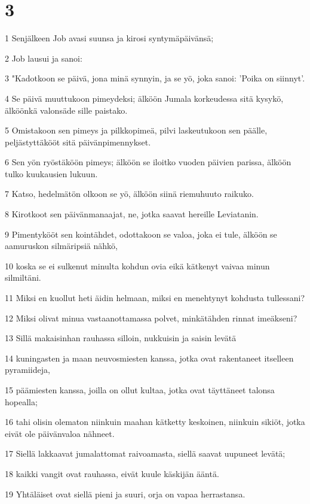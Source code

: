 \chapter{3}

\par 1 Senjälkeen Job avasi suunsa ja kirosi syntymäpäivänsä;
\par 2 Job lausui ja sanoi:
\par 3 "Kadotkoon se päivä, jona minä synnyin, ja se yö, joka sanoi: 'Poika on siinnyt'.
\par 4 Se päivä muuttukoon pimeydeksi; älköön Jumala korkeudessa sitä kysykö, älköönkä valonsäde sille paistako.
\par 5 Omistakoon sen pimeys ja pilkkopimeä, pilvi laskeutukoon sen päälle, peljästyttäkööt sitä päivänpimennykset.
\par 6 Sen yön ryöstäköön pimeys; älköön se iloitko vuoden päivien parissa, älköön tulko kuukausien lukuun.
\par 7 Katso, hedelmätön olkoon se yö, älköön siinä riemuhuuto raikuko.
\par 8 Kirotkoot sen päivänmanaajat, ne, jotka saavat hereille Leviatanin.
\par 9 Pimentykööt sen kointähdet, odottakoon se valoa, joka ei tule, älköön se aamuruskon silmäripsiä nähkö,
\par 10 koska se ei sulkenut minulta kohdun ovia eikä kätkenyt vaivaa minun silmiltäni.
\par 11 Miksi en kuollut heti äidin helmaan, miksi en menehtynyt kohdusta tullessani?
\par 12 Miksi olivat minua vastaanottamassa polvet, minkätähden rinnat imeäkseni?
\par 13 Sillä makaisinhan rauhassa silloin, nukkuisin ja saisin levätä
\par 14 kuningasten ja maan neuvosmiesten kanssa, jotka ovat rakentaneet itselleen pyramiideja,
\par 15 päämiesten kanssa, joilla on ollut kultaa, jotka ovat täyttäneet talonsa hopealla;
\par 16 tahi olisin olematon niinkuin maahan kätketty keskoinen, niinkuin sikiöt, jotka eivät ole päivänvaloa nähneet.
\par 17 Siellä lakkaavat jumalattomat raivoamasta, siellä saavat uupuneet levätä;
\par 18 kaikki vangit ovat rauhassa, eivät kuule käskijän ääntä.
\par 19 Yhtäläiset ovat siellä pieni ja suuri, orja on vapaa herrastansa.
